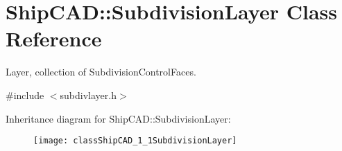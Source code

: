 \hypertarget{classShipCAD_1_1SubdivisionLayer}{}\section{Ship\+C\+AD\+:\+:Subdivision\+Layer Class Reference}
\label{classShipCAD_1_1SubdivisionLayer}


Layer, collection of Subdivision\+Control\+Faces.  




{\ttfamily \#include $<$subdivlayer.\+h$>$}

Inheritance diagram for Ship\+C\+AD\+:\+:Subdivision\+Layer\+:\begin{figure}[H]
\begin{center}
\leavevmode
\texttt{[image: classShipCAD\_1\_1SubdivisionLayer]}
\end{center}
\end{figure}
